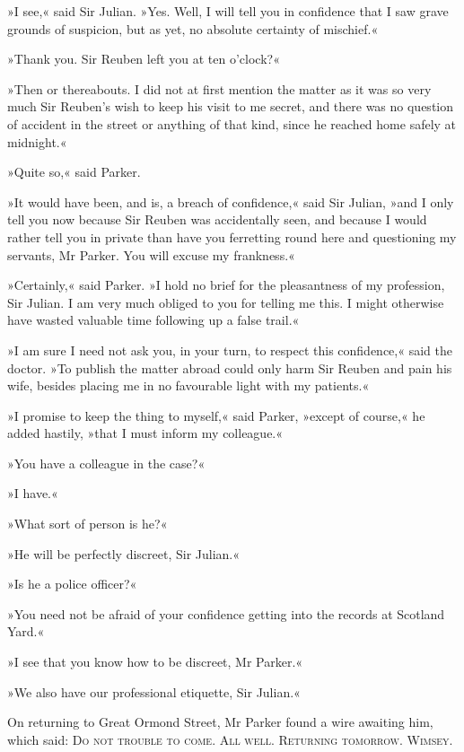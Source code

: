 »I see,« said Sir Julian. »Yes. Well, I will tell you in confidence that I saw grave grounds of suspicion, but as yet, no absolute certainty of mischief.«

»Thank you. Sir Reuben left you at ten o'clock?«

»Then or thereabouts. I did not at first mention the matter as it was so very much Sir Reuben's wish to keep his visit to me secret, and there was no question of accident in the street or anything of that kind, since he reached home safely at midnight.«

»Quite so,« said Parker.

»It would have been, and is, a breach of confidence,« said Sir Julian, »and I only tell you now because Sir Reuben was accidentally seen, and because I would rather tell you in private than have you ferretting round here and questioning my servants, Mr Parker. You will excuse my frankness.«

»Certainly,« said Parker. »I hold no brief for the pleasantness of my profession, Sir Julian. I am very much obliged to you for telling me this. I might otherwise have wasted valuable time following up a false trail.«

»I am sure I need not ask you, in your turn, to respect this confidence,« said the doctor. »To publish the matter abroad could only harm Sir Reuben and pain his wife, besides placing me in no favourable light with my patients.«

»I promise to keep the thing to myself,« said Parker, »except of course,« he added hastily, »that I must inform my colleague.«

»You have a colleague in the case?«

»I have.«

»What sort of person is he?«

»He will be perfectly discreet, Sir Julian.«

»Is he a police officer?«

»You need not be afraid of your confidence getting into the records at Scotland Yard.«

»I see that you know how to be discreet, Mr Parker.«

»We also have our professional etiquette, Sir Julian.«

On returning to Great Ormond Street, Mr Parker found a wire awaiting him, which said: \textsc{Do not trouble to come. All well. Returning tomorrow. Wimsey.}